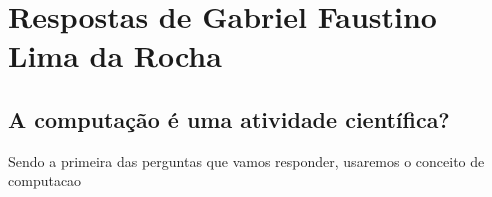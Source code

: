 \section{Respostas de Gabriel Faustino Lima da Rocha}

\subsection{A computação é uma atividade científica?}

Sendo a primeira das perguntas que vamos responder, usaremos o conceito de \gls{computacao}